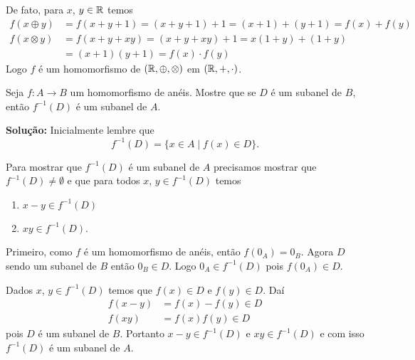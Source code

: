 \documentclass[12pt]{article}
\begin{document}
De fato, para $x$, $y \in \mathbb{R}$ temos
\begin{align*}
	f(x \oplus y) &= f(x + y + 1) = (x + y + 1) + 1 = (x + 1) + (y + 1) = f(x) + f(y)\\
	f(x \otimes y) &=  f(x + y + xy) = (x + y + xy) + 1 = x(1 + y) + (1 + y) \\ &= (x + 1)(y + 1) = f(x)\cdot f(y)
\end{align*}
Logo $f$ é um homomorfismo de $(\mathbb{R}, \oplus, \otimes)$ em $(\mathbb{R}, +, \cdot)$.

\vspace{.5cm}

\questao Seja $f: A \to B$ um homomorfismo de an{\'e}is. Mostre que se $D$ {\'e} um subanel de $B$, ent{\~a}o $f^{-1}(D)$ {\'e} um subanel de $A$.

\noindent\textbf{Solu\c{c}\~ao:} Inicialmente lembre que
\[
	f^{-1}(D) = \{x \in A \mid f(x) \in D\}.
\]

Para mostrar que $f^{-1}(D)$ é um subanel de $A$ precisamos mostrar que $f^{-1}(D) \ne \emptyset$ e que para todos $x$, $y \in f^{-1}(D)$ temos
\begin{enumerate}[label=({\alph*})]
	\item $x - y \in f^{-1}(D)$
	\item $xy \in f^{-1}(D)$.
\end{enumerate}

Primeiro, como $f$ é um homomorfismo de anéis, então $f(0_A) = 0_B$. Agora $D$ sendo um subanel de $B$ então $0_B \in D$. Logo $0_A \in f^{-1}(D)$ pois $f(0_A) \in D$.

Dados $x$, $y \in f^{-1}(D)$ temos que $f(x) \in D$ e $f(y) \in D$. Daí
\begin{align*}
	f(x - y) &= f(x) - f(y) \in D\\
	f(xy) &= f(x)f(y) \in D
\end{align*}
pois $D$ é um subanel de $B$. Portanto $x - y \in f^{-1}(D)$ e $xy \in f^{-1}(D)$ e com isso $f^{-1}(D)$ é um subanel de $A$.
\end{document}

